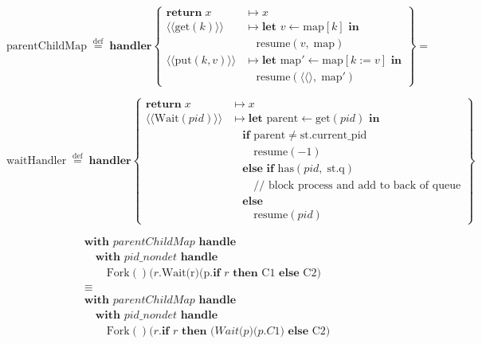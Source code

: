 \documentclass[logo,bsc,singlespacing,parskip]{infthesis}
\begin{document}
\[
\mathrm{parentChildMap} \;\overset{\mathrm{def}}{=}\; \textbf{handler}
\left\{
\begin{array}{ll}
\mathbf{return}\; x 
  & \mapsto x \\[1ex]

\langle\!\langle \mathrm{get}(k) \rangle\!\rangle 
  & \mapsto \textbf{let } v \leftarrow \mathrm{map}[k] \textbf{ in} \\
  & \quad \mathrm{resume}(v,\; \mathrm{map}) \\[1ex]

\langle\!\langle \mathrm{put}(k, v) \rangle\!\rangle 
  & \mapsto \textbf{let } \mathrm{map'} \leftarrow \mathrm{map}[k := v] \textbf{ in} \\
  & \quad \mathrm{resume}(\langle\langle\rangle,\; \mathrm{map'})
\end{array}
\right\}
=\]


\[
\mathrm{waitHandler} \;\overset{\mathrm{def}}{=}\; \textbf{handler}
\left\{
\begin{array}{ll}
\mathbf{return}\; x 
  & \mapsto x \\[1ex]

\langle\!\langle \mathrm{Wait}(pid) \rangle\!\rangle 
  & \mapsto \textbf{let } \mathrm{parent} \leftarrow \mathrm{get}(pid) \textbf{ in} \\
  & \quad \textbf{if } \mathrm{parent} \neq \mathrm{st.current\_pid} \\ & \quad\quad  \mathrm{resume}(-1) \\[0.5ex]
  & \quad \textbf{else if } \mathrm{has}(pid,\; \mathrm{st.q})  \\
  & \quad\quad \text{// block process and add to back of queue} \\
  & \quad \textbf{else } \\ & \quad\quad \mathrm{resume}(pid)
\end{array}
\right\}
\]



\[
\begin{array}{l}
\textbf{with } \mathit{parentChildMap} \textbf{ handle } \\
\quad\textbf{with } \mathit{pid\_nondet} \textbf{ handle } \\
\quad\quad \text{Fork}()(r. \text{Wait(r)(p.} \textbf{if } r  \textbf{ then } \text{C1} \textbf{ else } \text{C2)} \\[5pt]
\equiv \\
\textbf{with } \mathit{parentChildMap} \textbf{ handle } \\
\quad\textbf{with } \mathit{pid\_nondet} \textbf{ handle } \\\quad\quad \text{Fork}()(r. \textbf{if } r 
\textbf{ then } (\textit{Wait(p)(p.C1)} \textbf{ else } \text{C2)} \\[5pt]

\end{array}
\]
\end{document}
